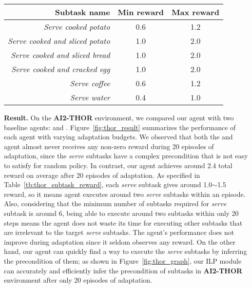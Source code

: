 \documentclass{article} \usepackage{iclr2020_conference,times}
\begin{document}
\begin{table*}[!hbt] 
\centering
\begin{tabular}{r|c|c}
\toprule
Subtask name                    & Min reward    & Max reward\\
        \midrule
\textit{Serve cooked potato}            & 0.6           & 1.2\\
\textit{Serve cooked and sliced potato} & 1.0           & 2.0\\
\textit{Serve cooked and sliced bread}  & 1.0           & 2.0\\
\textit{Serve cooked and cracked egg}   & 1.0           & 2.0\\
\textit{Serve coffee}                   & 0.6           & 1.2\\
\textit{Serve water}                    & 0.4           & 1.0\\
    \bottomrule
  \end{tabular}
\vspace{-2pt}
\caption{The range from which the subtask reward of \textit{serve} subtask was sampled, in the \textbf{AI2-THOR} environment.}
\label{tb:thor_subtask_reward}
\end{table*}



\textbf{Result.}
On the \textbf{AI2-THOR} environment, we compared our \NSGIGRProp agent with two baseline agents: \Random and \HRL. Figure~\ref{fig:thor_result} summarizes the performance of each agent with varying adaptation budgets. We observed that both the \Random and \HRL agent almost never receives any non-zero reward during 20 episodes of adaptation, since the \textit{serve} subtasks have a complex precondition that is not easy to satisfy for random policy. In contrast, our \NSGIGRProp agent achieves around 2.4 total reward on average after 20 episodes of adaptation. As specified in Table~\ref{tb:thor_subtask_reward}, each \textit{serve} subtask gives around 1.0$\sim$1.5 reward, so it means \NSGIGRProp agent executes around two \textit{serve} subtasks within an episode. Also, considering that the minimum number of subtasks required for \textit{serve} subtask is around 6, being able to execute around two subtasks within only 20 steps means the agent does not waste its time for executing other subtasks that are irrelevant to the target \textit{serve} subtasks. The \HRL agent's performance does not improve during adaptation since it seldom observes any reward. On the other hand, our \NSGIGRProp agent can quickly find a way to execute the \textit{serve} subtasks by inferring the precondition of them; as shown in Figure~\ref{fig:thor_graph}, our ILP module can accurately and efficiently infer the precondition of subtasks in \textbf{AI2-THOR} environment after only 20 episodes of adaptation. 
\end{document}
